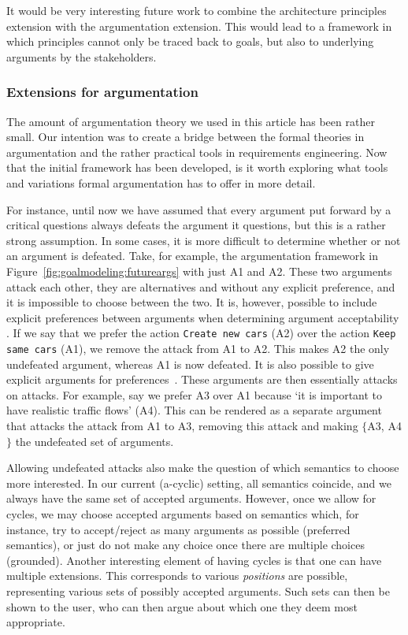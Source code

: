 It would be very interesting future work to combine the architecture principles extension with the argumentation extension. This would lead to a framework in which principles cannot only be traced back to goals, but also to underlying arguments by the stakeholders.

\subsubsection*{Extensions for argumentation}

The amount of argumentation theory we used in this article has been rather small. Our intention was to create a bridge between the formal theories in argumentation and the rather practical tools in requirements engineering. Now that the initial framework has been developed, is it worth exploring what tools and variations formal argumentation has to offer in more detail.

For instance, until now we have assumed that every argument put forward by a critical questions always defeats the argument it questions, but this is a rather strong assumption.  In some cases, it is more difficult to determine whether or not an argument is defeated. Take, for example, the argumentation framework in Figure~\ref{fig:goalmodeling:futureargs} with just A1 and A2. These two arguments attack each other, they are alternatives and without any explicit preference, and it is impossible to choose between the two. It is, however, possible to include explicit preferences between arguments when determining argument acceptability \cite{amgoud2002reasoning}. If we say that we prefer the action  \texttt{Create new cars} (A2) over the action  \texttt{Keep same cars} (A1), we remove the attack from A1 to A2. This makes A2 the only undefeated argument, whereas A1 is now defeated. It is also possible to give explicit arguments for preferences~\cite{modgil2009}. These arguments are then essentially attacks on attacks. For example, say we prefer A3 over A1 because `it is important to have realistic traffic flows' (A4). This can be rendered as a separate argument that attacks the attack from A1 to A3, removing this attack and making $\{$A3, A4$\}$ the undefeated set of arguments.

Allowing undefeated attacks also make the question of which semantics to choose more interested. In our current (a-cyclic) setting, all semantics coincide, and we always have the same set of accepted arguments. However, once we allow for cycles, we may choose accepted arguments based on semantics which, for instance, try to accept/reject as many arguments as possible (preferred semantics), or just do not make any choice once there are multiple choices (grounded). Another interesting element of having cycles is that one can have multiple extensions. This corresponds to various \emph{positions} are possible, representing various sets of possibly accepted arguments. Such sets can then be shown to the user, who can then argue about which one they deem most appropriate.


